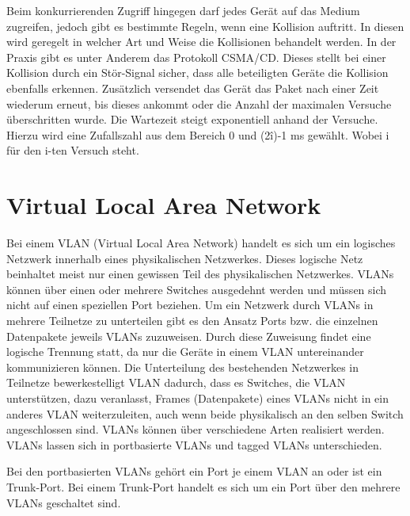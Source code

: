Beim konkurrierenden Zugriff hingegen darf jedes Gerät auf das Medium zugreifen, jedoch gibt es bestimmte Regeln, wenn eine Kollision auftritt. In diesen wird geregelt in welcher Art und Weise die Kollisionen behandelt werden. In der Praxis gibt es unter Anderem das Protokoll CSMA/CD.
Dieses stellt bei einer Kollision durch ein Stör-Signal sicher, dass alle beteiligten Geräte die Kollision ebenfalls erkennen.
Zusätzlich versendet das Gerät das Paket nach einer Zeit wiederum erneut, bis dieses ankommt oder die Anzahl der maximalen Versuche überschritten wurde. Die Wartezeit steigt exponentiell anhand der Versuche.
Hierzu wird eine Zufallszahl aus dem Bereich 0 und (2\^i)-1 ms gewählt.
Wobei i für den i-ten Versuch steht.

\section{Virtual Local Area Network}
\label{sec:vlan}

Bei einem VLAN (Virtual Local Area Network) handelt es sich um ein logisches Netzwerk innerhalb eines physikalischen Netzwerkes.
Dieses logische Netz beinhaltet meist nur einen gewissen Teil des physikalischen Netzwerkes.
VLANs können über einen oder mehrere Switches ausgedehnt werden und müssen sich nicht auf einen speziellen Port beziehen.
Um ein Netzwerk durch VLANs in mehrere Teilnetze zu unterteilen gibt es den Ansatz Ports bzw. die einzelnen Datenpakete jeweils VLANs zuzuweisen.
Durch diese Zuweisung findet eine logische Trennung statt, da nur die Geräte in einem VLAN untereinander kommunizieren können.
Die Unterteilung des bestehenden Netzwerkes in Teilnetze bewerkestelligt VLAN dadurch, dass es Switches, die VLAN unterstützen, dazu veranlasst, Frames (Datenpakete) eines VLANs nicht in ein anderes VLAN weiterzuleiten, auch wenn beide physikalisch an den selben Switch angeschlossen sind.
VLANs können über verschiedene Arten realisiert werden.
VLANs lassen sich in portbasierte VLANs und tagged VLANs unterschieden.

Bei den portbasierten VLANs gehört ein Port je einem VLAN an oder ist ein Trunk-Port.
Bei einem Trunk-Port handelt es sich um ein Port über den mehrere VLANs geschaltet sind.\\

